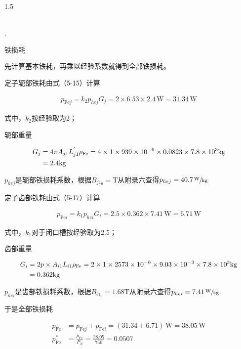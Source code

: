 \documentclass[a4paper,11pt]{ctexart}
\newcommand{\W}{\,\text{W}}
\newcommand{\T}{\text{T}}
\newcommand{\kg}{\text{kg}}
\newenvironment{shrinkeq}[2]
{
	\bgroup
	\addtolength\abovedisplayshortskip{#1}
	\addtolength\abovedisplayskip{#1}
	\addtolength\belowdisplayshortskip{#2}
	\addtolength\belowdisplayskip{#2}
}
{
	\egroup
	\ignorespacesafterend
}
\newcounter{designitem}
\newcommand{\entry}
{
	\vspace{0.5em}
	\par
	\stepcounter{designitem}
	\thedesignitem.
}
\begin{document}
\begin{spacing}{1.5}
\begin{shrinkeq}{-1.5ex}{-2ex}
\begin{align}
	\end{align}
\end{shrinkeq}
\entry
铁损耗
\par
先计算基本铁耗，再乘以经验系数就得到全部铁损耗。
\par
定子轭部铁耗由式（5-15）计算
\begin{shrinkeq}{-1.5ex}{-1.5ex}
	\begin{align}
	p_{\text{Fe}j} = k_2p_{hej}G_j = 2\times 6.53\times 2.4\W = 31.34\W
	\end{align}
\end{shrinkeq}
式中，$k_2$按经验取为2；
\par
轭部重量
\begin{shrinkeq}{-1.5ex}{-1.5ex}
	\begin{align}
	G_{j} &= 4\pi A_{j1}L_{j1}^{'}\rho_{\text{Fe}} = 4\times 1\times 939\times 10^{-6}\times 0.0823\times 7.8\times 10^{3}\kg \\
	&= 2.4\kg\notag
	\end{align}
\end{shrinkeq}
\par
$p_{hej}$是轭部铁损耗系数，根据$B_{j1_0} = \T$从附录六查得$p_{hej} = 40.7\sfrac{\W}{\kg}$
\par
定子齿部铁耗由式（5-17）计算
\begin{shrinkeq}{-1.5ex}{-1.5ex}
	\begin{align}
	p_{\text{Fe}i} = k_1p_{hei}G_{i} = 2.5\times 0.362\times 7.41\W = 6.71\W
	\end{align}
\end{shrinkeq}
式中，$k_1$对于闭口槽按经验取为$2.5$；
\par
齿部重量
\begin{shrinkeq}{-1.5ex}{-1.5ex}
	\begin{align}
	G_{i} &= 2p\times A_{i1}L_{i1}\rho_{\text{Fe}} = 2\times 1\times 2573\times 10^{-6}\times 9.03\times 10^{-3}\times 7.8\times 10^{3}\kg \\
	&= 0.362\kg\notag
	\end{align}
\end{shrinkeq}
\par
$p_{hei}$是齿部铁损耗系数，根据$B_{i1_0} = 1.68\T$从附录六查得$p_{hei} = 7.41\sfrac{\W}{\kg}$
\par
于是全部铁损耗
\begin{shrinkeq}{-1.5ex}{-2ex}
	\begin{align}
	p_{\text{Fe}} &= p_{\text{Fe}j}+p_{\text{Fe}i} = \left( 31.34+ 6.71\right)\W = 38.05\W\\
	p_{\text{Fe}}^{*}&=\frac{p_{\text{Fe}} }{P_{N}} = \frac{ 38.05}{750} =  0.0507 

\end{align}
\end{shrinkeq}
\end{spacing}
\end{document}
